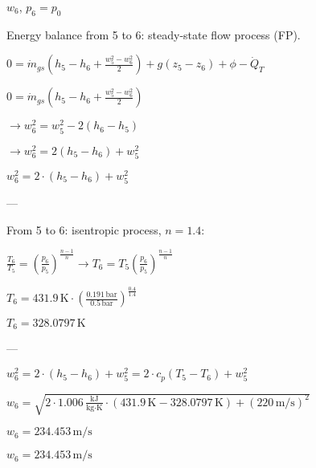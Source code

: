 \( w_6 \), \( p_6 = p_0 \)  

Energy balance from 5 to 6: steady-state flow process (FP).  

\( 0 = \dot{m}_{gs} \left( h_5 - h_6 + \frac{w_5^2 - w_6^2}{2} \right) + g(z_5 - z_6) + \phi - \dot{Q}_T \)  

\( 0 = \dot{m}_{gs} \left( h_5 - h_6 + \frac{w_5^2 - w_6^2}{2} \right) \)  

\( \rightarrow w_6^2 = w_5^2 - 2(h_6 - h_5) \)  

\( \rightarrow w_6^2 = 2(h_5 - h_6) + w_5^2 \)  

\( w_6^2 = 2 \cdot (h_5 - h_6) + w_5^2 \)  

---

From 5 to 6: isentropic process, \( n = 1.4 \):  

\( \frac{T_6}{T_5} = \left( \frac{p_6}{p_5} \right)^{\frac{n-1}{n}} \rightarrow T_6 = T_5 \left( \frac{p_6}{p_5} \right)^{\frac{n-1}{n}} \)  

\( T_6 = 431.9 \, \text{K} \cdot \left( \frac{0.191 \, \text{bar}}{0.5 \, \text{bar}} \right)^{\frac{0.4}{1.4}} \)  

\( T_6 = 328.0797 \, \text{K} \)  

---

\( w_6^2 = 2 \cdot (h_5 - h_6) + w_5^2 = 2 \cdot c_p(T_5 - T_6) + w_5^2 \)  

\( w_6 = \sqrt{2 \cdot 1.006 \, \frac{\text{kJ}}{\text{kg·K}} \cdot (431.9 \, \text{K} - 328.0797 \, \text{K}) + (220 \, \text{m/s})^2} \)  

\( w_6 = 234.453 \, \text{m/s} \)  

\( w_6 = 234.453 \, \text{m/s} \)